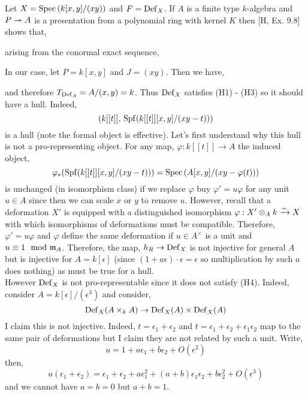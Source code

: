 \documentclass[12pt]{article}
\begin{document}
\begin{example}
Let $X = \mathrm{Spec}\left( k[x,y]/(xy) \right)$ and $F = \mathrm{Def}_X$. If $A$ is a finite type $k$-algebra and $P \twoheadrightarrow A$ is a presentation from a polynomial ring with kernel $K$ then [H, Ex. 9.8] shows that,
\begin{center}
\end{center}
arising from the conormal exact sequence,
\begin{center}
\end{center}
In our case, let $P = k[x,y]$ and $J = (xy)$. Then we have,
\begin{center}
\end{center}
and therefore $T_{\mathrm{Def}_A} = A/(x,y) = k$. Thus $\mathrm{Def}_X$ satisfies (H1) - (H3) so it should have a hull. Indeed,
\[ (k[[t]], \, \mathrm{Spf} \! \left(k[[t]][x,y]/(xy - t) \right)) \]
is a hull (note the formal object is effective). Let's first understand why this hull is not a pro-representing object. For any map, $\varphi : k[[t]] \to A$ the induced object,
\[ \varphi_*(\mathrm{Spf} \! \left(k[[t]][x,y]/(xy - t) \right)) = \mathrm{Spec}\left( A[x,y]/(xy - \varphi(t)) \right) \]
is unchanged (in isomorphism class) if we replace $\varphi$ buy $\varphi' = u \varphi$ for any unit $u \in A$ since then we can scale $x$ or $y$ to remove $u$. However, recall that a deformation $X'$ is equipped with a distinguished isomorphism $\varphi : X' \otimes_A k \xrightarrow{\sim} X$ with which isomorphisms of deformations must be compatible. Therefore, $\varphi' = u \varphi$ and $\varphi$ define the same deformation if $u \in A^\times$ is a unit and $u \equiv 1 \mod {\mathfrak{m}}_A$. Therefore, the map, $h_R \to \mathrm{Def}_X$ is not injective for general $A$ but is injective for $A = k[\epsilon]$ (since $(1 +  a \epsilon) \cdot \epsilon = \epsilon$ so multiplication by such $a$ does nothing) as must be true for a hull.  
\bigskip\\
However $\mathrm{Def}_X$ is not pro-representable since it does not satisfy (H4). Indeed, consider $A = k[\epsilon]/(\epsilon^3)$ and consider,
\[ \mathrm{Def}_X(A \times_k A) \to \mathrm{Def}_X(A) \times \mathrm{Def}_X(A) \]
I claim this is not injective. Indeed, $t = \epsilon_1 + \epsilon_2$ and $t = \epsilon_1 + \epsilon_2 + \epsilon_1 \epsilon_2$ map to the same pair of deformations but I claim they are not related by such a unit. Write,
\[ u = 1 + a \epsilon_1 + b \epsilon_2 + O(\epsilon^2) \]
then,
\[ u (\epsilon_1 + \epsilon_2) = \epsilon_1 + \epsilon_2 + a \epsilon_1^2 + (a + b) \epsilon_1 \epsilon_2 + b \epsilon_2^2 + O(\epsilon^3) \] 
and we cannot have $a = b = 0$ but $a + b = 1$.
\end{example}
\end{document}
